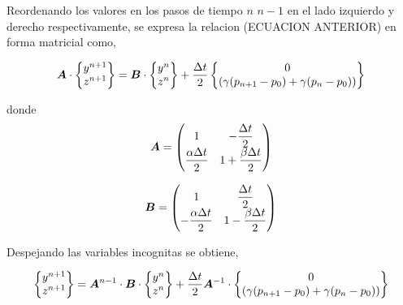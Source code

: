 Reordenando los valores en los pasos de tiempo $n$ $n-1$ en el lado izquierdo y derecho respectivamente, se expresa la relacion (ECUACION ANTERIOR) en forma matricial como,

\begin{equation}
\boldsymbol{A} \cdot
\begin{Bmatrix}
y^{n+1} \\ z^{n+1}
\end{Bmatrix} =
\boldsymbol{B} \cdot
\begin{Bmatrix}
y^n \\ z^n
\end{Bmatrix} + \dfrac{\Delta t}{2}
\begin{Bmatrix}
0 \\ \left( \gamma (p_{n+1}-p_0) + \gamma (p_{n}-p_0) \right)
\end{Bmatrix}
\end{equation}

donde
\begin{equation}
\boldsymbol{A} = \begin{pmatrix}
1 & -\dfrac{\Delta t}{2} \\
\dfrac{\alpha \Delta t}{2} & 1+ \dfrac{\beta \Delta t}{2}
\end{pmatrix} 
\end{equation}

\begin{equation}
\boldsymbol{B} = \begin{pmatrix}
1 & \dfrac{\Delta t}{2} \\
-\dfrac{\alpha \Delta t}{2} & 1-\dfrac{\beta \Delta t}{2}
\end{pmatrix}
\end{equation}

Despejando las variables incognitas se obtiene,

\begin{equation}
\begin{Bmatrix}
y^{n+1} \\ z^{n+1} 
\end{Bmatrix} =
\boldsymbol{A}^{n-1} \cdot \boldsymbol{B} \cdot 
\begin{Bmatrix}
y^n \\ z^n 
\end{Bmatrix} + \dfrac{\Delta t}{2} \boldsymbol{A}^{-1} \cdot
\begin{Bmatrix}
0 \\ \left( \gamma (p_{n+1}-p_0) + \gamma (p_{n}-p_0) \right)
\end{Bmatrix}
\end{equation}

